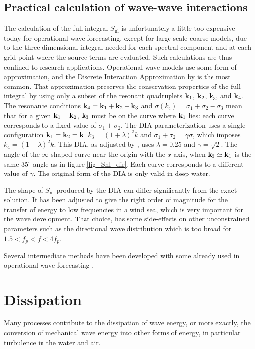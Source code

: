 \subsection{Practical calculation of wave-wave interactions}
The calculation of the full integral $S_{\mathrm{nl}}$ is unfortunately a little too expensive today for operational wave forecasting, 
except for large scale coarse models, due to the three-dimensional integral needed for each spectral component and at each grid point where the 
source terms are evaluated. Such calculations are thus confined to research applications. Operational wave models use some form of approximation, and the Discrete 
Interaction Approximation by \cite{Hasselmann&al.1985} is the most common. That approximation preserves the conservation properties of the full integral 
by using only a subset of the resonant quadruplets  $\mathbf{k}_1$,  $\mathbf{k}_2$, ${\mathbf
k}_3$, and $\mathbf{k}_4$. 
The resonance conditions $\mathbf{k}_4=\mathbf{k}_1+\mathbf{k}_2-\mathbf{k}_3$ and $\sigma\left(k_4\right)=\sigma_1+\sigma_2-\sigma_3$ 
mean that for a given $\mathbf{k}_1+\mathbf{k}_2$, $\mathbf{k}_3$ must be on the curve where $\mathbf{k}_1$ lies: each curve corresponds to a fixed value of $\sigma_1 + \sigma_2$.
The DIA parameterization uses a single configuration  ${\mathbf
k}_1=\mathbf{k}_2=\mathbf{k}$, $k_3 = (1+\lambda)^2 k$ and
$\sigma_1+\sigma_2=\gamma \sigma$, which imposes $k_4 =
(1-\lambda)^2 k$. This DIA, as adjusted by \cite{Hasselmann&al.1985b}, uses  $\lambda=0.25$ and $\gamma
= \sqrt{2}$. 
The angle of the $\infty$-shaped curve near the origin with the $x$-axis, when $\mathbf{k}_3 \simeq \mathbf{k}_1$ is the same 35$^{\circ}$ angle as in figure \ref{fig_Snl_dir}. Each 
curve corresponds to a different value of $\gamma$.
The original form of the DIA is only valid in deep water. 

The shape of  $S_{\mathrm{nl}}$ produced by the DIA can differ significantly from the exact solution. It has been adjusted to give the right order 
of magnitude for the transfer of energy to low frequencies in a wind sea, which is very important for the wave development. That choice, has some side-effects on other unconstrained
parameters such as the directional wave distribution which is too broad for  $1.5 <f_p <f<4 f_p$.

Several intermediate methods have been developed with some already used in operational wave forecasting \citep[e.g.][]{Komatsu&Masuda1996}. 


\section{Dissipation\label{section_whitecap}}
Many processes contribute to the dissipation of wave energy, or more exactly, the conversion of 
mechanical wave energy into other forms of energy, in particular turbulence in the water and air. 

